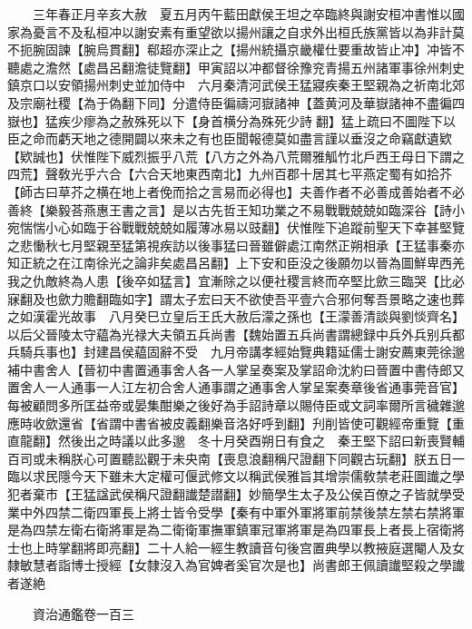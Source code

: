 　　三年春正月辛亥大赦　夏五月丙午藍田獻侯王坦之卒臨終與謝安桓冲書惟以國家為憂言不及私桓冲以謝安素有重望欲以揚州讓之自求外出桓氏族黨皆以為非計莫不扼腕固諫【腕烏貫翻】郗超亦深止之【揚州統攝京畿權仕要重故皆止冲】冲皆不聽處之澹然【處昌呂翻澹徒覽翻】甲寅詔以冲都督徐豫兖青揚五州諸軍事徐州刺史鎮京口以安領揚州刺史並加侍中　六月秦清河武侯王猛寢疾秦王堅親為之祈南北郊及宗廟社稷【為于偽翻下同】分遣侍臣徧禱河嶽諸神【蓋黄河及華嶽諸神不盡徧四嶽也】猛疾少瘳為之赦殊死以下【身首横分為殊死少詩翻】猛上疏曰不圖陛下以臣之命而虧天地之德開闢以來未之有也臣聞報德莫如盡言謹以垂沒之命竊獻遺欵【欵誠也】伏惟陛下威烈振乎八荒【八方之外為八荒爾雅觚竹北戶西王母日下謂之四荒】聲敎光乎六合【六合天地東西南北】九州百郡十居其七平燕定蜀有如拾芥【師古曰草芥之横在地上者俛而拾之言易而必得也】夫善作者不必善成善始者不必善終【樂毅荅燕惠王書之言】是以古先哲王知功業之不易戰戰兢兢如臨深谷【詩小宛惴惴小心如臨于谷戰戰兢兢如履薄冰易以豉翻】伏惟陛下追蹤前聖天下幸甚堅覽之悲慟秋七月堅親至猛第視疾訪以後事猛曰晉雖僻處江南然正朔相承【王猛事秦亦知正統之在江南徐光之論非矣處昌呂翻】上下安和臣没之後願勿以晉為圖鮮卑西羌我之仇敵終為人患【後卒如猛言】宜漸除之以便社稷言終而卒堅比歛三臨哭【比必寐翻及也歛力贍翻臨如字】謂太子宏曰天不欲使吾平壹六合邪何奪吾景略之速也葬之如漢霍光故事　八月癸巳立皇后王氏大赦后濛之孫也【王濛善清談與劉惔齊名】以后父晉陵太守藴為光禄大夫領五兵尚書【魏始置五兵尚書謂總録中兵外兵别兵都兵騎兵事也】封建昌侯藴固辭不受　九月帝講孝經始覽典籍延儒士謝安薦東莞徐邈補中書舍人【晉初中書置通事舍人各一人掌呈奏案及掌詔命沈約曰晉置中書侍郎又置舍人一人通事一人江左初合舍人通事謂之通事舍人掌呈案奏章後省通事莞音官】每被顧問多所匡益帝或晏集酣樂之後好為手詔詩章以賜侍臣或文詞率爾所言穢雜邈應時收歛還省【省謂中書省被皮義翻樂音洛好呼到翻】刋削皆使可觀經帝重覽【重直龍翻】然後出之時議以此多邈　冬十月癸酉朔日有食之　秦王堅下詔曰新喪賢輔百司或未稱朕心可置聽訟觀于未央南【喪息浪翻稱尺證翻下同觀古玩翻】朕五日一臨以求民隱今天下雖未大定權可偃武修文以稱武侯雅旨其增崇儒敎禁老莊圖䜟之學犯者棄市【王猛諡武侯稱尺證翻䜟楚譛翻】妙簡學生太子及公侯百僚之子皆就學受業中外四禁二衛四軍長上將士皆令受學【秦有中軍外軍將軍前禁後禁左禁右禁將軍是為四禁左衛右衛將軍是為二衛衛軍撫軍鎮軍冠軍將軍是為四軍長上者長上宿衛將士也上時掌翻將即亮翻】二十人給一經生教讀音句後宫置典學以教掖庭選閹人及女隸敏慧者詣博士授經【女隸沒入為官婢者奚官次是也】尚書郎王佩讀䜟堅殺之學䜟者遂絶

　　資治通鑑卷一百三  
    


 


 



